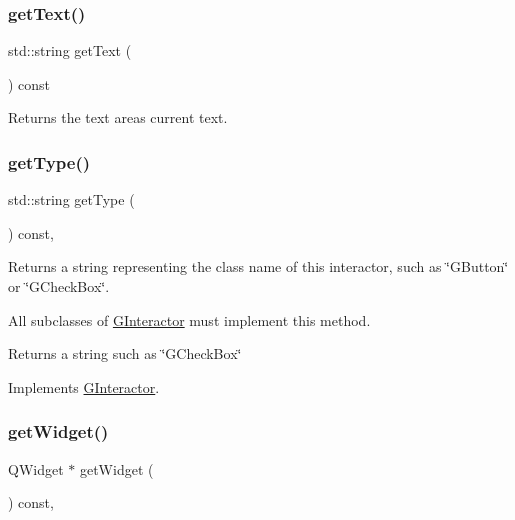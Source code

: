 \subsubsection{\texorpdfstring{get\+Text()}{getText()}}
{\footnotesize\ttfamily std\+::string get\+Text (\begin{DoxyParamCaption}{ }\end{DoxyParamCaption}) const\hspace{0.3cm}{\ttfamily [virtual]}}



Returns the text area\textquotesingle{}s current text. 

\mbox{\label{classsgl_1_1GTextArea_a9b72ede4ee8520f987a0c01e30654814}} 
\subsubsection{\texorpdfstring{get\+Type()}{getType()}}
{\footnotesize\ttfamily std\+::string get\+Type (\begin{DoxyParamCaption}{ }\end{DoxyParamCaption}) const\hspace{0.3cm}{\ttfamily [override]}, {\ttfamily [virtual]}}



Returns a string representing the class name of this interactor, such as \char`\"{}\+G\+Button\char`\"{} or \char`\"{}\+G\+Check\+Box\char`\"{}. 

All subclasses of \mbox{\hyperlink{classsgl_1_1GInteractor}{G\+Interactor}} must implement this method. \begin{DoxyReturn}{Returns}
a string such as \char`\"{}\+G\+Check\+Box\char`\"{} 
\end{DoxyReturn}


Implements \mbox{\hyperlink{classsgl_1_1GInteractor_a44c407a54a20dd0f2fff30338289299d}{G\+Interactor}}.

\mbox{\label{classsgl_1_1GTextArea_a3b33a602b31a6b809d020535a59db3b4}} 
\subsubsection{\texorpdfstring{get\+Widget()}{getWidget()}}
{\footnotesize\ttfamily Q\+Widget $\ast$ get\+Widget (\begin{DoxyParamCaption}{ }\end{DoxyParamCaption}) const\hspace{0.3cm}{\ttfamily [override]}, {\ttfamily [virtual]}}




